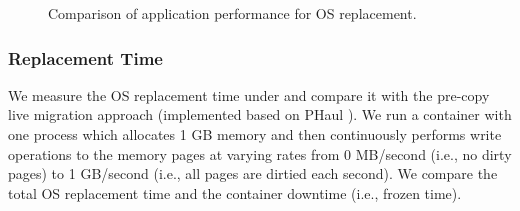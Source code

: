 \begin{figure}
	\centering
		\hspace{-0.1in}
	\caption{Comparison of application performance for OS replacement.}
	\label{fig:impl1}
\end{figure}
%	

\subsubsection{Replacement Time}
We measure the OS replacement time under \arch and compare it with the pre-copy live migration approach (implemented based on PHaul \cite{phaul}). We run a container with one process which allocates 1 GB memory and then continuously performs write operations to the memory pages at varying rates from 0 MB/second (i.e., no dirty pages) to 1 GB/second (i.e., all pages are dirtied each second). We compare the total OS replacement time and the container downtime (i.e., frozen time).

